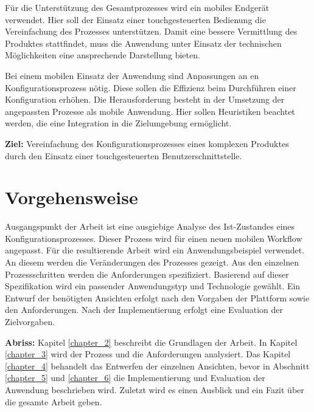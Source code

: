 Für die Unterstützung des Gesamtprozesses wird ein mobiles Endgerät verwendet. Hier soll der Einsatz einer touchgesteuerten Bedienung die Vereinfachung des Prozesses unterstützen. Damit eine bessere Vermittlung des Produktes stattfindet, muss die Anwendung unter Einsatz der technischen Möglichkeiten eine ansprechende Darstellung bieten. 

Bei einem mobilen Einsatz der Anwendung sind Anpassungen an en Konfigurationsprozess nötig. Diese sollen die Effizienz beim Durchführen einer Konfiguration erhöhen. Die Herausforderung besteht in der Umsetzung der angepassten Prozesse als mobile Anwendung. Hier sollen Heuristiken beachtet werden, die eine Integration in die Zielumgebung ermöglicht. 



\begin{mdframed}[backgroundcolor=gray!40,shadow=true,roundcorner=8pt]
\textbf{Ziel:} \newline
Vereinfachung des Konfigurationsprozesses eines komplexen Produktes durch den Einsatz einer touchgesteuerten Benutzerschnittstelle.
\end{mdframed}

\section{Vorgehensweise}
Ausgangspunkt der Arbeit ist eine ausgiebige Analyse des Ist-Zustandes eines Konfigurationsprozesses. Dieser Prozess wird für einen neuen mobilen Workflow angepasst. Für die resultierende Arbeit wird ein Anwendungsbeispiel verwendet. An diesem werden die Veränderungen des Prozesses gezeigt. Aus den einzelnen Prozessschritten werden die Anforderungen spezifiziert. Basierend auf dieser Spezifikation wird ein passender Anwendungstyp und Technologie gewählt. Ein Entwurf der benötigten Ansichten erfolgt nach den Vorgaben der Plattform sowie den Anforderungen. Nach der Implementierung erfolgt eine Evaluation der Zielvorgaben. 
\par
\textbf{Abriss: }
Kapitel \ref{chapter_2} beschreibt die Grundlagen der Arbeit. In Kapitel \ref{chapter_3} wird der Prozess und die Anforderungen analysiert. Das Kapitel \ref{chapter_4} behandelt das Entwerfen der einzelnen Ansichten, bevor in Abschnitt \ref{chapter_5} und \ref{chapter_6} die Implementierung und Evaluation der Anwendung beschrieben wird. Zuletzt wird es einen Ausblick und ein Fazit über die gesamte Arbeit geben.







